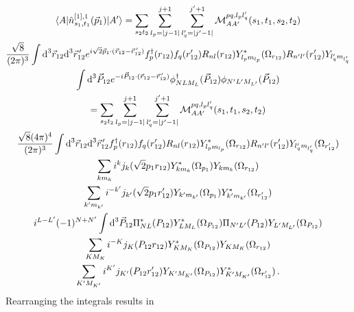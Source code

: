 \documentclass[10pt]{article}
\begin{document}
\begin{multline*}
	\braket{ A | \hat{n}_{s_1,t_1}^{[1],1}(\vec{p}_1) | A'} = \sum_{s_2 
t_2} 
 \sum_{l_p = |j-1|}^{j+1} \sum_{l_q' = |j' - 1|}^{j'+1} \mathcal{M}_{AA'}^{p 
q,l_p l_q'}(s_1,t_1,s_2,t_2) \\
    \frac{\sqrt{8}}{(2 \pi)^{3}} \int \text{d}^{3} \vec{r}_{12} \text{d}^{3} 
\vec{r}_{12}^{\, \prime}  e^{ i \sqrt{2} \vec{p}_{1} \cdot ( \vec{r}_{12} - 
\vec{r}_{12}^{\, \prime}) } f_{p}^{\dagger}(r_{12}) f_{q}(r_{12}')  
R_{nl}(r_{12})Y_{l_pm_{l_p}}^*(\Omega_{r_{12}}) 
R_{n'l'}(r'_{12})Y_{l'_qm_{l'_q}} \\
   \int \text{d}^{3} \vec{P}_{12} e^{ -i \vec{P}_{12} \cdot (\vec{r}_{12} - 
\vec{r}_{12}^{\, \prime})} \phi_{N L M_L}^{\dagger}(\vec{P}_{12}) \phi_{N' L' 
M_{L'}}(\vec{P}_{12})  \\
   = \sum_{s_2 t_2}  \sum_{l_p = |j-1|}^{j+1} \sum_{l_q' = |j' - 1|}^{j'+1} 
\mathcal{M}_{AA'}^{p q,l_p l_q'}(s_1,t_1,s_2,t_2) \\
    \frac{\sqrt{8} (4 \pi)^{4}}{(2 \pi)^{3}} \int \text{d}^{3} \vec{r}_{12} 
\text{d}^{3} \vec{r}_{12}^{\, \prime} f_{p}^{\dagger}(r_{12}) f_{q}(r_{12}')  
R_{n l}(r_{12}) Y_{l_p m_{l_p}}^{*}(\Omega_{r_{12}}) R_{n' l'}(r_{12}') 
Y_{l_q' m_{l_q'}}(\Omega_{r_{12}'}) \\
   \sum_{k m_k} i^{k} j_{k}( \sqrt{2} p_1 r_{12}) Y_{k m_k}^{*}(\Omega_{p_1}) 
Y_{k m_k}(\Omega_{r_{12}}) \\
   \sum_{k' m_{k'}} i^{-k'} j_{k'}( \sqrt{2} p_1 r_{12}') Y_{k' 
m_{k'}}(\Omega_{p_1}) Y_{k' m_{k'}}^{*}(\Omega_{r_{12}'}) \\
   i^{L-L'} (-1)^{N+N'}
   \int \text{d}^{3} \vec{P}_{12} \Pi_{N L}^{*}(P_{12}) Y_{L 
M_L}^{*}(\Omega_{P_{12}}) \Pi_{N' L'}(P_{12}) Y_{L' M_{L'}}(\Omega_{P_{12}})   
\\
   \sum_{K M_K} i^{-K} j_{K}(P_{12} r_{12}) Y_{K M_K}^{*}(\Omega_{P_{12}}) Y_{K 
M_K}(\Omega_{r_{12}}) \\
   \sum_{K' M_{K'}} i^{K'} j_{K'}(P_{12} r_{12}') Y_{K' 
M_{K'}}(\Omega_{P_{12}}) Y_{K' M_{K'}}^{*}(\Omega_{r_{12}'}) \, . \\
\end{multline*}
Rearranging the integrals results in
\end{document}
